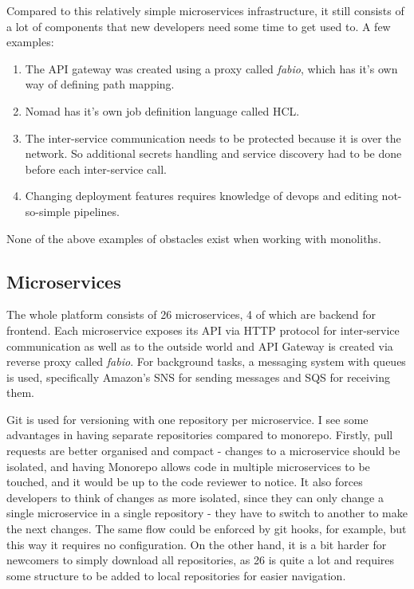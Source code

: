 Compared to this relatively simple microservices infrastructure, it still consists of a lot of components that new developers need some time to get used to. A few examples:
\begin{enumerate}
    \item The API gateway was created using a proxy called \textit{fabio}, which has it's own way of defining path mapping.
    \item Nomad has it's own job definition language called HCL.
    \item The inter-service communication needs to be protected because it is over the network. So additional secrets handling and service discovery had to be done before each inter-service call.
    \item Changing deployment features requires knowledge of devops and editing not-so-simple pipelines.
\end{enumerate}
None of the above examples of obstacles exist when working with monoliths.



\subsection{Microservices}
The whole platform consists of 26 microservices, 4 of which are backend for frontend. Each microservice exposes its API via HTTP protocol for inter-service communication as well as to the outside world and API Gateway is created via reverse proxy called \textit{fabio}. For background tasks, a messaging system with queues is used, specifically Amazon's SNS for sending messages and SQS for receiving them.

Git is used for versioning with one repository per microservice. I see some advantages in having separate repositories compared to monorepo. Firstly, pull requests are better organised and compact - changes to a microservice should be isolated, and having Monorepo allows code in multiple microservices to be touched, and it would be up to the code reviewer to notice. It also forces developers to think of changes as more isolated, since they can only change a single microservice in a single repository - they have to switch to another to make the next changes. The same flow could be enforced by git hooks, for example, but this way it requires no configuration. On the other hand, it is a bit harder for newcomers to simply download all repositories, as 26 is quite a lot and requires some structure to be added to local repositories for easier navigation.

